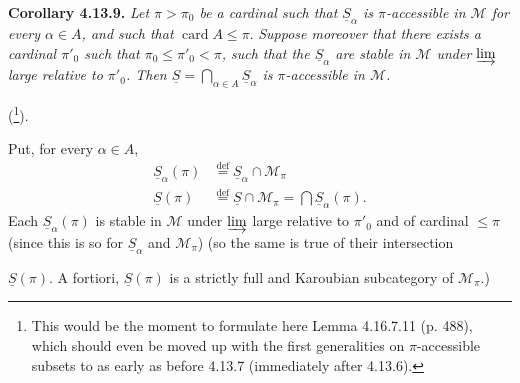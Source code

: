 \documentclass[11pt]{article}
\newcommand{\msp}[1]{\marginpar{\footnotesize [#1]}}
\newcommand{\M}{\mathcal{M}}
\newcommand{\card}{\operatorname{card}}
\newcommand{\uS}{\underline{S}}
\begin{document}
\textbf{Corollary 4.13.9.} \textit{Let $\pi > \pi_0$ be a cardinal such that $\uS_\alpha$ is $\pi$-accessible in $\M$ for every $\alpha \in A$, and such that} $\card A \leqslant \pi$. \textit{Suppose moreover that there exists a cardinal $\pi'_0$ such that $\pi_0 \leqslant \pi'_0 < \pi$, such that the $\uS_\alpha$ are stable in $\M$ under $\varinjlim$ large relative to $\pi'_0$. Then $\uS = \bigcap_{\alpha\in A} \uS_\alpha$ is $\pi$-accessible in $\M$.}

(\footnote[124]{This would be the moment to formulate here Lemma 4.16.7.11 (p. 488), which should even be moved up with the first generalities on $\pi$-accessible subsets to as early as before 4.13.7 (immediately after 4.13.6).}).

Put, for every $\alpha \in A$,
\[
\begin{aligned}
\uS_\alpha(\pi) &\overset{\text{def}}{=} \uS_\alpha \cap \M_\pi \\
\uS(\pi) &\overset{\text{def}}{=} \uS \cap \M_\pi = \bigcap \uS_\alpha(\pi) .
\end{aligned}
\]
Each $\uS_\alpha(\pi)$ is stable in $\M$ under $\varinjlim$ large relative to $\pi'_0$ and of cardinal $\leqslant \pi$ (since this is so for $\uS_\alpha$ and $\M_\pi$) (so the same is true of their intersection

\msp{page 293}
$\uS(\pi)$. A fortiori, $\uS(\pi)$ is a strictly full and Karoubian subcategory of $\M_\pi$.)
\end{document}
